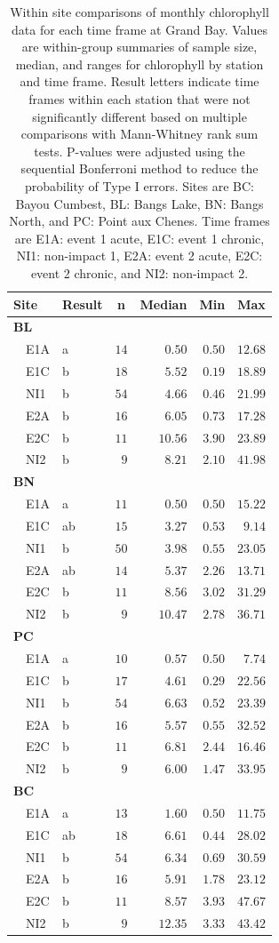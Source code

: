 \documentclass[letterpaper,12pt]{article}\usepackage[]{graphicx}\usepackage[]{color}
\begin{document}
\clearpage

\begin{table}[!tbp]
\caption{Within site comparisons  of monthly chlorophyll data for each time frame at Grand Bay.  Values are within-group summaries of sample size, median, and ranges for chlorophyll by station and time frame.  Result letters indicate time frames within each station that were not significantly different based on multiple comparisons with Mann-Whitney rank sum tests.  P-values were adjusted using the sequential Bonferroni method to reduce the probability of Type I errors. Sites are BC: Bayou Cumbest, BL: Bangs Lake, BN: Bangs North, and PC: Point aux Chenes.  Time frames are E1A: event 1 acute, E1C: event 1 chronic, NI1: non-impact 1, E2A: event 2 acute, E2C: event 2 chronic, and NI2: non-impact 2.\label{tab:chltab}} 
\begin{center}
\begin{tabular}{llrrrr}
\hline\hline
\multicolumn{1}{l}{Site}&\multicolumn{1}{c}{Result}&\multicolumn{1}{c}{n}&\multicolumn{1}{c}{Median}&\multicolumn{1}{c}{Min}&\multicolumn{1}{c}{Max}\tabularnewline
\hline
{\bfseries BL}&&&&&\tabularnewline
~~E1A&a&$14$&$ 0.50$&$0.50$&$12.68$\tabularnewline
~~E1C&b&$18$&$ 5.52$&$0.19$&$18.89$\tabularnewline
~~NI1&b&$54$&$ 4.66$&$0.46$&$21.99$\tabularnewline
~~E2A&b&$16$&$ 6.05$&$0.73$&$17.28$\tabularnewline
~~E2C&b&$11$&$10.56$&$3.90$&$23.89$\tabularnewline
~~NI2&b&$ 9$&$ 8.21$&$2.10$&$41.98$\tabularnewline
\hline
{\bfseries BN}&&&&&\tabularnewline
~~E1A&a&$11$&$ 0.50$&$0.50$&$15.22$\tabularnewline
~~E1C&ab&$15$&$ 3.27$&$0.53$&$ 9.14$\tabularnewline
~~NI1&b&$50$&$ 3.98$&$0.55$&$23.05$\tabularnewline
~~E2A&ab&$14$&$ 5.37$&$2.26$&$13.71$\tabularnewline
~~E2C&b&$11$&$ 8.56$&$3.02$&$31.29$\tabularnewline
~~NI2&b&$ 9$&$10.47$&$2.78$&$36.71$\tabularnewline
\hline
{\bfseries PC}&&&&&\tabularnewline
~~E1A&a&$10$&$ 0.57$&$0.50$&$ 7.74$\tabularnewline
~~E1C&b&$17$&$ 4.61$&$0.29$&$22.56$\tabularnewline
~~NI1&b&$54$&$ 6.63$&$0.52$&$23.39$\tabularnewline
~~E2A&b&$16$&$ 5.57$&$0.55$&$32.52$\tabularnewline
~~E2C&b&$11$&$ 6.81$&$2.44$&$16.46$\tabularnewline
~~NI2&b&$ 9$&$ 6.00$&$1.47$&$33.95$\tabularnewline
\hline
{\bfseries BC}&&&&&\tabularnewline
~~E1A&a&$13$&$ 1.60$&$0.50$&$11.75$\tabularnewline
~~E1C&ab&$18$&$ 6.61$&$0.44$&$28.02$\tabularnewline
~~NI1&b&$54$&$ 6.34$&$0.69$&$30.59$\tabularnewline
~~E2A&b&$16$&$ 5.91$&$1.78$&$23.12$\tabularnewline
~~E2C&b&$11$&$ 8.57$&$3.93$&$47.67$\tabularnewline
~~NI2&b&$ 9$&$12.35$&$3.33$&$43.42$\tabularnewline
\hline
\end{tabular}\end{center}

\end{table}
\end{document}
